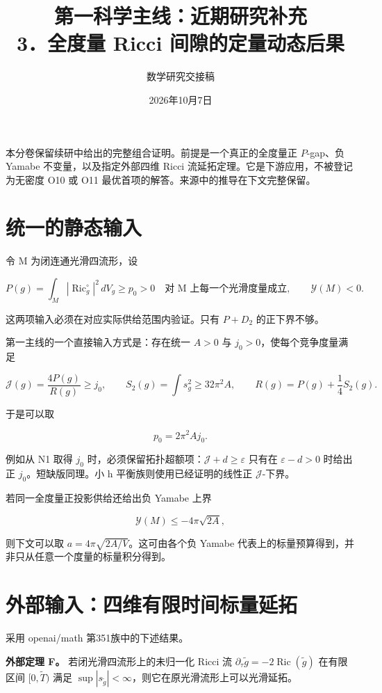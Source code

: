 \documentclass[UTF8,11pt,fontset=none]{ctexart}
\title{第一科学主线：近期研究补充\\[6pt]\large 3．全度量 Ricci 间隙的定量动态后果}
\author{数学研究交接稿}\date{2026年10月7日}
\theoremstyle{definition}
\theoremstyle{remark}
\begin{document}
\maketitle
\tableofcontents
\clearpage
本分卷保留续研中给出的完整组合证明。前提是一个真正的全度量正 \(P\)-gap、负 Yamabe 不变量，以及指定外部四维 Ricci 流延拓定理。它是下游应用，不被登记为无密度 O10 或 O11 最优首项的解答。来源中的推导在下文完整保留。\cite{R02,OAI351Flow,Ishida2008}

\section{统一的静态输入}\label{v3-ux7edfux4e00ux7684ux9759ux6001ux8f93ux5165}

令 M 为闭连通光滑四流形，设

\[
 P(g)=\int_M|\operatorname{Ric}^{\circ}_g|^2\,dV_g\ge p_0>0
 \quad\text{对 M 上每一个光滑度量成立},
 \qquad \mathcal Y(M)<0.
\]

这两项输入必须在对应实际供给范围内验证。只有 \(P+D_2\) 的正下界不够。

第一主线的一个直接输入方式是：存在统一 \(A>0\) 与 \(j_0>0\)，使每个竞争度量满足

\[
 \mathcal J(g)=\frac{4P(g)}{R(g)}\ge j_0,
 \qquad S_2(g)=\int s_g^2\ge32\pi^2A,
 \qquad R(g)=P(g)+\frac14S_2(g).
\]

于是可以取

\[
 \boxed{p_0=2\pi^2 A j_0.}
\]

例如从 N1 取得 \(j_0\) 时，必须保留拓扑超额项：\(\mathcal J+d\ge\varepsilon\) 只有在 \(\varepsilon-d>0\) 时给出正 \(j_0\)。短缺版同理。小 h 平衡族则使用已经证明的线性正 \(\mathcal J\)-下界。

若同一全度量正投影供给还给出负 Yamabe 上界

\[
 \mathcal Y(M)\le-4\pi\sqrt{2A},
\]

则下文可以取 \(a=4\pi\sqrt{2A/V}\)。这可由各个负 Yamabe 代表上的标量预算得到，并非只从任意一个度量的标量积分得到。

\section{外部输入：四维有限时间标量延拓}\label{v3-ux5916ux90e8ux8f93ux5165ux56dbux7ef4ux6709ux9650ux65f6ux95f4ux6807ux91cfux5ef6ux62d3}

采用 openai/math 第351族中的下述结果。

\textbf{外部定理 F。} 若闭光滑四流形上的未归一化 Ricci 流 \(\partial_\tau\widetilde g=-2\operatorname{Ric}(\widetilde g)\) 在有限区间 \([0,\widetilde T)\) 满足 \(\sup|s_{\widetilde g}|<\infty\)，则它在原光滑流形上可以光滑延拓。
\end{document}
